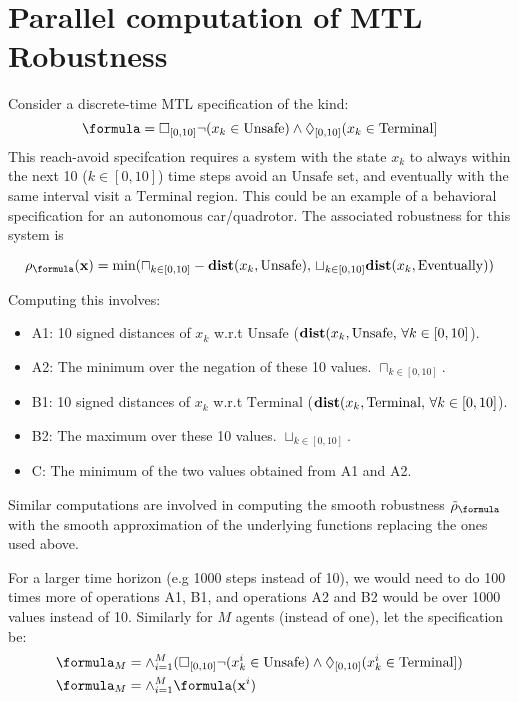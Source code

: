 \section{Parallel computation of MTL Robustness}
Consider a discrete-time MTL specification of the kind:
\begin{equation}
\formula = \always_{[0,10]} \neg (x_k \in \text{Unsafe}) \land \eventually_{[0,10]}(x_k \in \text{Terminal}]
\end{equation}
This reach-avoid specifcation requires a system with the state $x_k$ to always within the next 10 ($k \in [0,10]$) time steps avoid an $\text{Unsafe}$ set, and eventually with the same interval visit a $\text{Terminal}$ region. This could be an example of a behavioral specification for an autonomous car/quadrotor. The associated robustness for this system is

\begin{equation}
 \rho_{\formula}(\mathbf{x}) = \text{min}(\sqcap_{k \in [0,10]}-\dist(x_k,\text{Unsafe}),\, \sqcup_{k \in [0,10]} \dist(x_k,\text{Eventually}))
\end{equation}

Computing this involves:
\begin{itemize}
\item A1: 10 signed distances of $x_k$ w.r.t $\text{Unsafe}$ ($\mathbf{dist}(x_k,\text{Unsafe},\,\forall k \in [0,10]$).
\item A2: The minimum over the negation of these 10 values. $\sqcap_{k \in [0,10]}$.
\item B1: 10 signed distances of $x_k$ w.r.t $\text{Terminal}$ ($\mathbf{dist}(x_k,\text{Terminal},\,\forall k \in [0,10]$).
\item B2: The maximum over these 10 values. $\sqcup_{k \in [0,10]}$.
\item C: The minimum of the two values obtained from A1 and A2. 
\end{itemize}
Similar computations are involved in computing the smooth robustness $\srob_\formula$ with the smooth approximation of the underlying functions replacing the ones used above.

For a larger time horizon (e.g 1000 steps instead of 10), we would need to do 100 times more of operations A1, B1, and operations A2 and B2 would be over 1000 values instead of 10.
Similarly for $M$ agents (instead of one), let the specification be:
\begin{subequations}
\begin{align}
\formula_M &= \land_{i=1}^M (\always_{[0,10]} \neg(x^i_k  \in \text{Unsafe}) \land \eventually_{[0,10]}(x^i_k \in \text{Terminal}]) \\
\formula_M &= \land_{i=1}^M \formula(\mathbf{x}^i)
\end{align}
\end{subequations}

